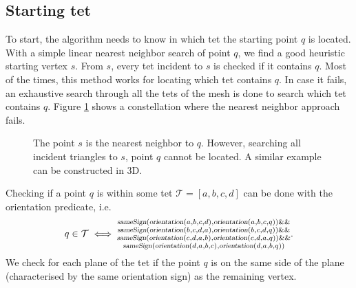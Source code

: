\documentclass[../thesis.tex]{subfiles}
\begin{document}
\subsection{Starting tet}\label{subsec:starttet}
To start, the algorithm needs to know in which tet the starting point $q$ is located.
With a simple linear nearest neighbor search of point $q$, we find a good heuristic starting vertex
$s$. From $s$, every tet incident to $s$ is checked if it contains $q$.
Most of the times, this
method works for locating which tet contains $q$. In case it fails,
an exhaustive search through all the tets of the mesh is done to search
which tet contains $q$. Figure \ref{fig:fail} shows a constellation where the nearest
neighbor approach fails.
\begin{figure}[htb]
  \centering
  \def\svgwidth{10em}
  
  \caption{The point $s$ is the nearest neighbor to $q$. However, searching all incident triangles to $s$, point $q$ cannot be located.
  A similar example can be constructed in 3D.
  }\label{fig:fail}
\end{figure}
Checking if a point $q$ is within some tet $\mathcal{T}= [a,b,c,d]$ can be done with the orientation predicate, i.e.
$$q \in \mathcal{T} \iff \substack{
  \textsl{sameSign}(\textsl{orientation}(a,b,c,d), \textsl{orientation}(a,b,c,q)) \&\& \\
  \textsl{sameSign}(\textsl{orientation}(b,c,d,a), \textsl{orientation}(b,c,d,q)) \&\& \\
  \textsl{sameSign}(\textsl{orientation}(c,d,a,b), \textsl{orientation}(c,d,a,q)) \&\& \\
  \textsl{sameSign}(\textsl{orientation}(d,a,b,c), \textsl{orientation}(d,a,b,q))
}.$$
We check for each plane of the tet if the point $q$ is on the same side of the plane
(characterised by the same orientation sign) as the remaining vertex.
\end{document}

